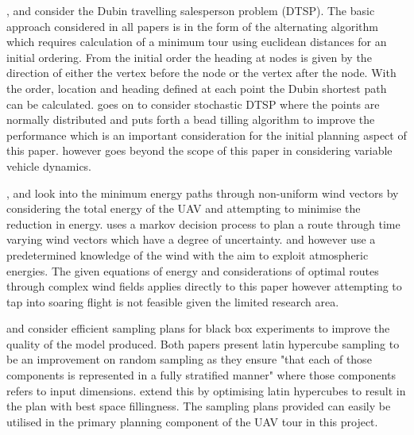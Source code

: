 \cite{Savla2005a}, \cite{Savla2005} and \cite{LeNy2008} consider the Dubin travelling salesperson problem (DTSP). The basic approach considered in all papers is in the form of the alternating algorithm which requires calculation of a minimum tour using euclidean distances for an initial ordering. From the initial order the heading at nodes is given by the direction of either the vertex before the node or the vertex after the node. With the order, location and heading defined at each point the Dubin shortest path can be calculated. \cite{Savla2005} goes on to consider stochastic DTSP where the points are normally distributed and puts forth a bead tilling algorithm to improve the performance which is an important consideration for the initial planning aspect of this paper. \cite{LeNy2008} however goes beyond the scope of this paper in considering variable vehicle dynamics.

\cite{Al-Sabban}, \cite{Chakrabarty2009} and \cite{Langelaan2007} look into the minimum energy paths through non-uniform wind vectors by considering the total energy of the UAV and attempting to minimise the reduction in energy. \cite{Al-Sabban} uses a markov decision process to plan a route through time varying wind vectors which have a degree of uncertainty. \cite{Chakrabarty2009} and \cite{Langelaan2007} however use a predetermined knowledge of the wind with the aim to exploit atmospheric energies. The given equations of energy and considerations of optimal routes through complex wind fields applies directly to this paper however attempting to tap into soaring flight is not feasible given the limited research area.

\cite{Forrester2008} and \cite{McKay2000} consider efficient sampling plans for black box experiments to improve the quality of the model produced. Both papers present latin hypercube sampling to be an improvement on random sampling as they ensure "that each of those components is represented in a fully stratified manner" \cite{McKay2000} where those components refers to input dimensions. \cite{Forrester2008} extend this by optimising latin hypercubes to result in the plan with best space fillingness. The sampling plans provided can easily be utilised in the primary planning component of the UAV tour in this project.
